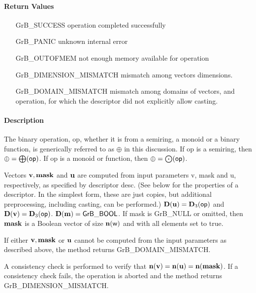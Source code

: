 \paragraph{Return Values}

\begin{itemize}[leftmargin=2.1in]
\item[{\sf GrB\_SUCCESS}]             operation completed successfully
\item[{\sf GrB\_PANIC}]               unknown internal error
\item[{\sf GrB\_OUTOFMEM}]            not enough memory available for operation
\item[{\sf GrB\_DIMENSION\_MISMATCH}] mismatch among vectors dimensions.
\item[{\sf GrB\_DOMAIN\_MISMATCH}]    mismatch among domains of vectors, and operation, for which the descriptor did not explicitly allow casting.
\end{itemize}

\paragraph{Description}

The binary operation, {\sf op}, whether it is from a semiring, a monoid or a binary function,
is generically referred to as $\oplus$ in this discussion.
If {\sf op} is a semiring, then $\oplus = \bigoplus({\sf op})$. 
If {\sf op} is a monoid or function, then $\oplus = \bigodot({\sf op})$.

Vectors ${\bf v}, {\bf mask}$ and ${\bf u}$ are computed from
input parameters {\sf v}, {\sf mask} and {\sf u}, respectively, as specified
by descriptor {\sf desc}. (See below for the properties of a descriptor. In
the simplest form, these are just copies, but additional preprocessing,
including casting, can be performed.)  $\bold{D}({\bf u}) =
\bold{D}_3({\sf op})$ and $\bold{D}({\bf v}) = \bold{D}_3({\sf op})$.
$\bold{D}({\bf m}) = {\sf GrB\_BOOL}$.  If {\sf mask} is {\sf GrB\_NULL} or omitted,
then ${\bf mask}$ is a Boolean vector of size $\bold{n}({\bf \sf w})$
and with all elements set to {\sf true}.

If either ${\bf v}, {\bf mask}$ or ${\bf u}$ cannot be computed
from the input parameters as described above, the method returns {\sf
GrB\_DOMAIN\_MISMATCH}.

A consistency check is performed to verify that $\bold{n}({\bf v})
= \bold{n}({\bf u}) = \bold{n}({\bf mask})$. If a consistency check fails, the operation is
aborted and the method returns {\sf GrB\_DIMENSION\_MISMATCH}.

